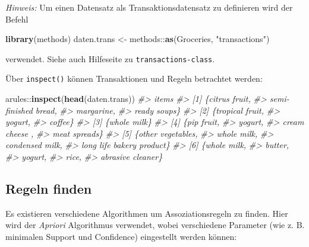 \documentclass[12pt,]{book}
\newenvironment{Shaded}{\begin{snugshade}}{\end{snugshade}}
\newcommand{\KeywordTok}[1]{\textcolor[rgb]{0.13,0.29,0.53}{\textbf{{#1}}}}
\newcommand{\StringTok}[1]{\textcolor[rgb]{0.31,0.60,0.02}{{#1}}}
\newcommand{\CommentTok}[1]{\textcolor[rgb]{0.56,0.35,0.01}{\textit{{#1}}}}
\newcommand{\NormalTok}[1]{{#1}}
\begin{document}
\emph{Hinweis:} Um einen Datensatz als Transaktionsdatensatz zu
definieren wird der Befehl

\begin{Shaded}
\begin{Highlighting}[]
\KeywordTok{library}\NormalTok{(methods)}
\NormalTok{daten.trans <-}\StringTok{ }\NormalTok{methods::}\KeywordTok{as}\NormalTok{(Groceries, }\StringTok{"transactions"}\NormalTok{)}
\end{Highlighting}
\end{Shaded}

verwendet. Siehe auch Hilfeseite zu \texttt{transactions-class}.

Über \texttt{inspect()} können Transaktionen und Regeln betrachtet
werden:

\begin{Shaded}
\begin{Highlighting}[]
\NormalTok{arules::}\KeywordTok{inspect}\NormalTok{(}\KeywordTok{head}\NormalTok{(daten.trans))}
\CommentTok{#>     items                     }
\CommentTok{#> [1] \{citrus fruit,            }
\CommentTok{#>      semi-finished bread,     }
\CommentTok{#>      margarine,               }
\CommentTok{#>      ready soups\}             }
\CommentTok{#> [2] \{tropical fruit,          }
\CommentTok{#>      yogurt,                  }
\CommentTok{#>      coffee\}                  }
\CommentTok{#> [3] \{whole milk\}              }
\CommentTok{#> [4] \{pip fruit,               }
\CommentTok{#>      yogurt,                  }
\CommentTok{#>      cream cheese ,           }
\CommentTok{#>      meat spreads\}            }
\CommentTok{#> [5] \{other vegetables,        }
\CommentTok{#>      whole milk,              }
\CommentTok{#>      condensed milk,          }
\CommentTok{#>      long life bakery product\}}
\CommentTok{#> [6] \{whole milk,              }
\CommentTok{#>      butter,                  }
\CommentTok{#>      yogurt,                  }
\CommentTok{#>      rice,                    }
\CommentTok{#>      abrasive cleaner\}}
\end{Highlighting}
\end{Shaded}

\subsection{Regeln finden}\label{regeln-finden}

Es existieren verschiedene Algorithmen um Assoziationsregeln zu finden.
Hier wird der \emph{Apriori} Algorithmus verwendet, wobei verschiedene
Parameter (wie z. B. minimalen Support und Confidence) eingestellt
werden können:
\end{document}
